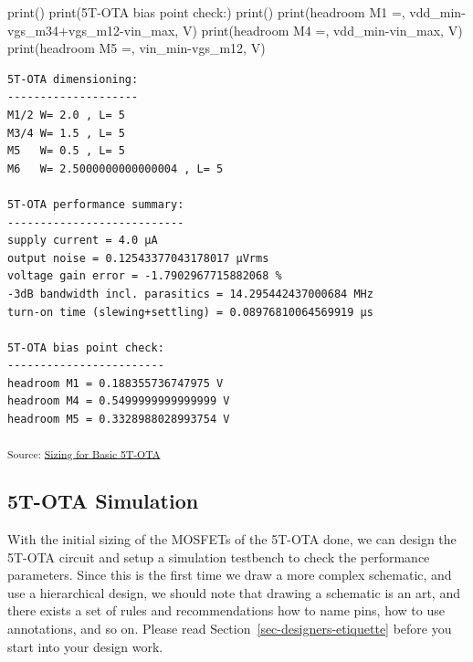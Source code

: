\documentclass[
  a4paper,
  DIV=11,
  numbers=noendperiod]{scrartcl}
\newenvironment{Shaded}{\begin{snugshade}}{\end{snugshade}}
\newcommand{\BuiltInTok}[1]{\textcolor[rgb]{0.00,0.23,0.31}{#1}}
\newcommand{\NormalTok}[1]{\textcolor[rgb]{0.00,0.23,0.31}{#1}}
\newcommand{\OperatorTok}[1]{\textcolor[rgb]{0.37,0.37,0.37}{#1}}
\newcommand{\StringTok}[1]{\textcolor[rgb]{0.13,0.47,0.30}{#1}}
\begin{document}
\begin{tcolorbox}
\begin{Shaded}
\begin{Highlighting}[]
\BuiltInTok{print}\NormalTok{()}
\BuiltInTok{print}\NormalTok{(}\StringTok{\textquotesingle{}5T{-}OTA bias point check:\textquotesingle{}}\NormalTok{)}
\BuiltInTok{print}\NormalTok{(}\StringTok{\textquotesingle{}{-}{-}{-}{-}{-}{-}{-}{-}{-}{-}{-}{-}{-}{-}{-}{-}{-}{-}{-}{-}{-}{-}{-}{-}\textquotesingle{}}\NormalTok{)}
\BuiltInTok{print}\NormalTok{(}\StringTok{\textquotesingle{}headroom M1 =\textquotesingle{}}\NormalTok{, vdd\_min}\OperatorTok{{-}}\NormalTok{vgs\_m34}\OperatorTok{+}\NormalTok{vgs\_m12}\OperatorTok{{-}}\NormalTok{vin\_max, }\StringTok{\textquotesingle{}V\textquotesingle{}}\NormalTok{)}
\BuiltInTok{print}\NormalTok{(}\StringTok{\textquotesingle{}headroom M4 =\textquotesingle{}}\NormalTok{, vdd\_min}\OperatorTok{{-}}\NormalTok{vin\_max, }\StringTok{\textquotesingle{}V\textquotesingle{}}\NormalTok{)}
\BuiltInTok{print}\NormalTok{(}\StringTok{\textquotesingle{}headroom M5 =\textquotesingle{}}\NormalTok{, vin\_min}\OperatorTok{{-}}\NormalTok{vgs\_m12, }\StringTok{\textquotesingle{}V\textquotesingle{}}\NormalTok{)}
\end{Highlighting}
\end{Shaded}

\begin{verbatim}
5T-OTA dimensioning:
--------------------
M1/2 W= 2.0 , L= 5
M3/4 W= 1.5 , L= 5
M5   W= 0.5 , L= 5
M6   W= 2.5000000000000004 , L= 5

5T-OTA performance summary:
---------------------------
supply current = 4.0 µA
output noise = 0.12543377043178017 µVrms
voltage gain error = -1.7902967715882068 %
-3dB bandwidth incl. parasitics = 14.295442437000684 MHz
turn-on time (slewing+settling) = 0.08976810064569919 µs

5T-OTA bias point check:
------------------------
headroom M1 = 0.188355736747975 V
headroom M4 = 0.5499999999999999 V
headroom M5 = 0.3328988028993754 V
\end{verbatim}

\textsubscript{Source:
\href{https://iic-jku.github.io/analog-circuit-design/sizing/sizing_basic_ota-preview.html\#cell-0}{Sizing
for Basic 5T-OTA}}

\end{tcolorbox}

\subsection{5T-OTA Simulation}\label{sec-basic-ota-simulation}

With the initial sizing of the MOSFETs of the 5T-OTA done, we can design
the 5T-OTA circuit and setup a simulation testbench to check the
performance parameters. Since this is the first time we draw a more
complex schematic, and use a hierarchical design, we should note that
drawing a schematic is an art, and there exists a set of rules and
recommendations how to name pins, how to use annotations, and so on.
Please read Section~\ref{sec-designers-etiquette} before you start into
your design work.
\end{document}
